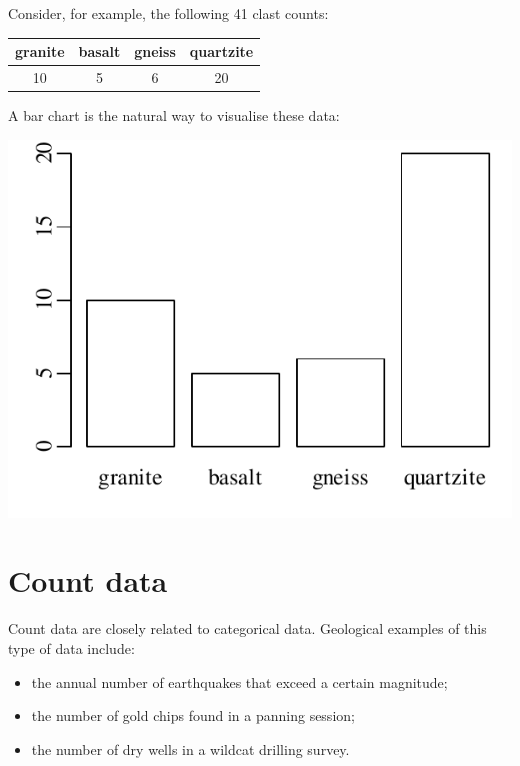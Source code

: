 Consider, for example, the following 41 clast counts:

\begin{center}
  \begin{tabular}{cccc}
    granite & basalt & gneiss & quartzite \\ \hline
    10 & 5 & 6 & 20  
  \end{tabular}
\end{center}

A bar chart is the natural way to visualise these data:\medskip

\noindent\begin{minipage}[t][][b]{.4\textwidth}
  \includegraphics[width=\textwidth]{../figures/clasts.pdf}
\end{minipage}
\begin{minipage}[t][][t]{.6\textwidth}
  \label{fig:clasts}
\end{minipage}

\section{Count data}
\label{sec:counts}

Count data are closely related to categorical data. Geological
examples of this type of data include:

\begin{itemize}
\item the annual number of earthquakes that exceed a certain
  magnitude;
\item the number of gold chips found in a panning session;
\item the number of dry wells in a wildcat drilling survey.
\end{itemize}

